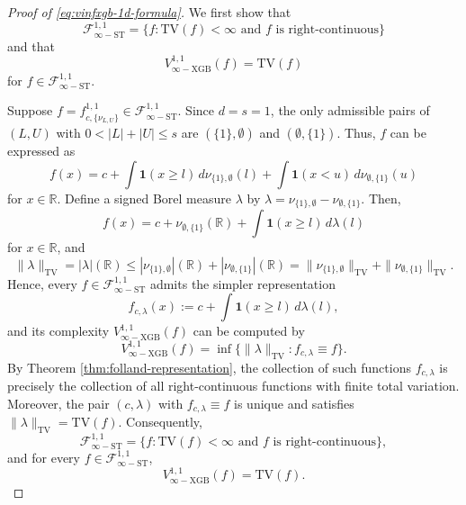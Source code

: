 \documentclass[10pt]{article}
\newcommand{\R}{{\mathbb R}}
\newcommand{\tv}{{\text{TV}}}
\newcommand{\ind}{{\mathbf{1}}}
\begin{document}
\begin{proof}[Proof of \eqref{eq:vinfxgb-1d-formula}]
We first show that 
\begin{equation*}
    \mathcal{F}^{1, 1}_{\infty-\text{ST}}  
    = \big\{f: \tv(f) < \infty \text{ and } 
    f \text{ is right-continuous}\big\} 
\end{equation*}
and that 
\begin{equation*}
    V^{1, 1}_{\infty-\text{XGB}}(f) = \tv(f)
\end{equation*}
for $f \in \mathcal{F}^{1, 1}_{\infty-\text{ST}}$.

Suppose 
$f = f^{1, 1}_{c, \{\nu_{L, U}\}} \in \mathcal{F}^{1, 1}_{\infty-\text{ST}}$.
Since $d = s = 1$, the only admissible pairs of $(L, U)$ with 
$0 < |L| + |U| \le s$ are $(\{1\}, \emptyset)$ and 
$(\emptyset, \{1\})$.
Thus, $f$ can be expressed as
\begin{equation*}
    f(x) = c + \int \ind(x \ge l) \, d\nu_{\{1\}, \emptyset}(l)
    + \int \ind(x < u) \, d\nu_{\emptyset, \{1\}}(u)
\end{equation*}
for $x \in \R$. Define a signed Borel measure $\lambda$ by 
$\lambda = \nu_{\{1\}, \emptyset} - \nu_{\emptyset, \{1\}}$. 
Then,
\begin{equation*}
    f(x) = c + \nu_{\emptyset, \{1\}}(\R)
    + \int \ind(x \ge l) \, d\lambda(l)
\end{equation*}
for $x \in \R$, and  
\begin{equation*}
    \|\lambda\|_{\text{TV}} = |\lambda|(\R)
    \le |\nu_{\{1\}, \emptyset}|(\R) 
    + |\nu_{\emptyset, \{1\}}|(\R) 
    = \|\nu_{\{1\}, \emptyset}\|_{\text{TV}} 
    + \|\nu_{\emptyset, \{1\}}\|_{\text{TV}}. 
\end{equation*}
Hence, every $f \in \mathcal{F}^{1, 1}_{\infty-\text{ST}}$ admits 
the simpler representation
\begin{equation*}
    f_{c, \lambda} (x) :=  c + \int \ind(x \ge l) \, d\lambda(l),
\end{equation*}
and its complexity $V^{1, 1}_{\infty-\text{XGB}}(f)$ can be computed by
\begin{equation*}
    V^{1, 1}_{\infty-\text{XGB}}(f) 
    = \inf\{\|\lambda\|_{\text{TV}}: f_{c, \lambda} \equiv f \}.
\end{equation*}
By Theorem \ref{thm:folland-representation}, the collection of such
functions $f_{c, \lambda}$ is precisely the collection of all
right-continuous functions with finite total variation. Moreover, 
the pair $(c, \lambda)$ with $f_{c, \lambda} \equiv f$ is unique and 
satisfies $\|\lambda\|_{\text{TV}} = \tv(f)$. Consequently, 
\begin{equation*}
    \mathcal{F}^{1, 1}_{\infty-\text{ST}}  
    = \big\{f: \tv(f) < \infty \text{ and } 
    f \text{ is right-continuous}\big\},
\end{equation*}
and for every $f \in \mathcal{F}^{1, 1}_{\infty-\text{ST}}$, 
\begin{equation*}
    V^{1, 1}_{\infty-\text{XGB}}(f) = \tv(f).
\end{equation*}


\end{proof}
\end{document}
